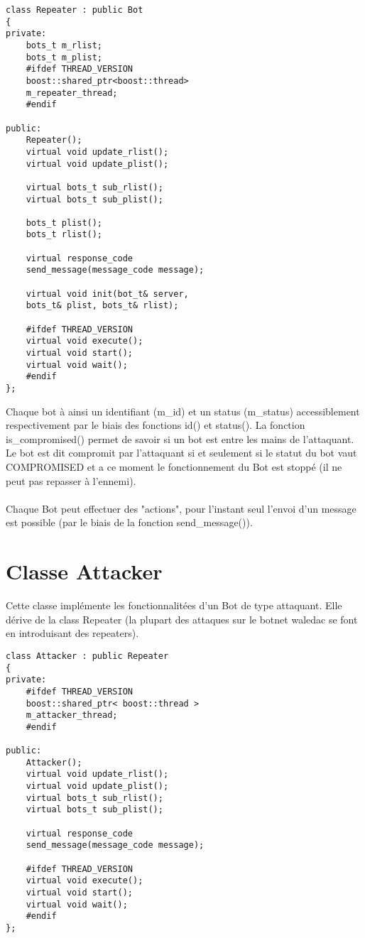 \documentclass[11pt]{article}
\begin{document}
\begin{minipage}[c]{.46\linewidth}
\begin{verbatim} 
class Repeater : public Bot
{
private:
	bots_t m_rlist;
	bots_t m_plist;
	#ifdef THREAD_VERSION
	boost::shared_ptr<boost::thread> 
	m_repeater_thread;
	#endif

public:
	Repeater();
	virtual void update_rlist();
	virtual void update_plist();
	
	virtual bots_t sub_rlist();
	virtual bots_t sub_plist();
	
	bots_t plist();
	bots_t rlist();
	
	virtual response_code 
	send_message(message_code message);
	
	virtual void init(bot_t& server, 
	bots_t& plist, bots_t& rlist);
	
	#ifdef THREAD_VERSION
	virtual void execute();
	virtual void start();
	virtual void wait();
	#endif
};
\end{verbatim}	
\end{minipage} \hfill
\begin{minipage}[c]{.46\linewidth}
Chaque bot à ainsi un identifiant (m\_id) et un status (m\_status) accessiblement respectivement par le biais des fonctions id() et status(). 
La fonction is\_compromised() permet de savoir si un bot est entre les mains de l'attaquant. Le bot est dit compromit par l'attaquant si et 
seulement si le statut du bot vaut COMPROMISED et a ce moment le fonctionnement du Bot est stoppé (il ne peut pas repasser à l'ennemi).\\\\Chaque Bot peut effectuer des "actions", pour l'instant seul l'envoi d'un message est possible (par le biais de la fonction send\_message()).
\end{minipage}

\newpage
\section{Classe Attacker}
Cette classe implémente les fonctionnalitées d'un Bot de type attaquant. Elle dérive de la class Repeater (la plupart des attaques sur le botnet waledac se font en introduisant des repeaters).\\

\begin{minipage}[c]{.46\linewidth}
\begin{verbatim} 
class Attacker : public Repeater
{
private:
	#ifdef THREAD_VERSION
	boost::shared_ptr< boost::thread > 
	m_attacker_thread;
	#endif

public:
	Attacker();
	virtual void update_rlist();
	virtual void update_plist();
	virtual bots_t sub_rlist();
	virtual bots_t sub_plist();
	
	virtual response_code 
	send_message(message_code message);
	
	#ifdef THREAD_VERSION
	virtual void execute();
	virtual void start();
	virtual void wait();
	#endif
};
\end{verbatim}	
\end{minipage} \hfill
\begin{minipage}[c]{.46\linewidth}

\end{minipage}
\end{document}
